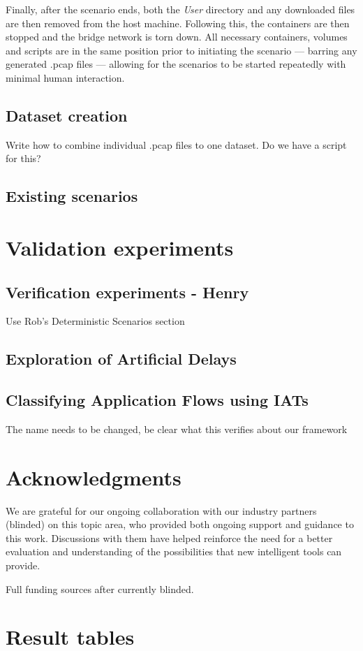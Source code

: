 \documentclass[sigconf,anonymous]{acmart}\usepackage[]{graphicx}\usepackage[]{color}
\begin{document}
    Finally, after the scenario ends, both the \textit{User} directory and any downloaded files are then removed from the host machine. Following this, the containers are then stopped and the bridge network is torn down. All necessary containers, volumes and scripts are in the same position prior to initiating the scenario --- barring any generated .pcap files --- allowing for the scenarios to be started repeatedly with minimal human interaction.
        

\subsection{Dataset creation}
Write how to combine individual .pcap files to one dataset. Do we have a script for this?

\subsection{Existing scenarios}


\section{Validation experiments}

\subsection{Verification experiments - Henry}

Use Rob's Deterministic Scenarios section

\subsection{Exploration of Artificial Delays}

\subsection{Classifying Application Flows using IATs}
The name needs to be changed, be clear what this verifies about our framework




\section{Acknowledgments}

We are grateful for our ongoing collaboration with our industry partners (blinded) on this topic area, who provided both ongoing support and guidance to this work. Discussions with them have helped reinforce the need for a better evaluation and understanding of the possibilities that new intelligent tools can provide.

Full funding sources after currently blinded.


  


\appendix

\section{Result tables}





 
\end{document}
